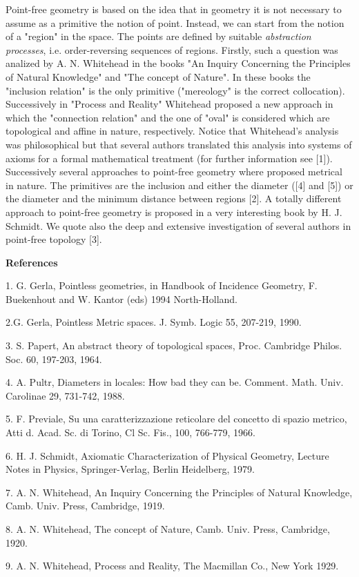 \documentclass[12pt]{article}
\begin{document}
Point-free geometry is based on the idea that in geometry it is not necessary to assume as a primitive the notion of point. Instead, we can start from the notion of a "region" in the space. The points are defined by suitable \textit{abstraction processes}, i.e. order-reversing sequences of regions. Firstly, such a question was analized by A. N. Whitehead in the books "An Inquiry Concerning the Principles of Natural Knowledge" and "The concept of Nature". In these books the "inclusion relation" is the only primitive ("mereology" is the correct collocation). Successively in "Process and Reality" Whitehead proposed a new approach in which the "connection relation" and the one of "oval" is considered which are topological and affine in nature, respectively. Notice that Whitehead's analysis was philosophical but that several authors translated this analysis into systems of axioms for a formal mathematical treatment (for further information see [1]). Successively several approaches to point-free geometry where proposed metrical in nature. The primitives are the inclusion and either the diameter ([4] and [5]) or the diameter and the minimum distance between regions [2]. A totally different approach to point-free geometry is proposed in a very interesting book by H. J. Schmidt. We quote also the deep and extensive investigation of several authors in point-free topology [3].

\textbf{References}

1. G. Gerla, Pointless geometries, in Handbook of Incidence Geometry, F. Buekenhout and W. Kantor (eds) 1994 North-Holland.

2.G. Gerla, Pointless Metric spaces. J. Symb. Logic 55, 207-219, 1990.

3. S. Papert, An abstract theory of topological spaces, Proc. Cambridge Philos. Soc. 60, 197-203, 1964.

4. A. Pultr, Diameters in locales: How bad they can be. Comment. Math. Univ. Carolinae 29, 731-742, 1988.

5. F. Previale, Su una caratterizzazione reticolare del concetto di spazio metrico, Atti d. Acad. Sc. di Torino, Cl Sc. Fis., 100, 766-779, 1966.

6. H. J. Schmidt, Axiomatic Characterization of Physical Geometry, Lecture Notes in Physics, Springer-Verlag, Berlin Heidelberg, 1979.

7. A. N. Whitehead, An Inquiry Concerning the Principles of Natural Knowledge, Camb. Univ. Press, Cambridge, 1919.

8. A. N. Whitehead, The concept of Nature, Camb. Univ. Press, Cambridge, 1920.

9. A. N. Whitehead, Process and Reality, The Macmillan Co., New York 1929.

\end{document}
